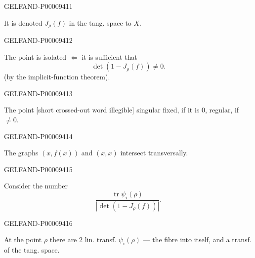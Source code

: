 \begin{GelfandAdjacentEvidence}{GELFAND-P000094}{11}

It is denoted $J_\rho(f)$ in the tang. space to $X$.
\end{GelfandAdjacentEvidence}
\begin{GelfandAdjacentEvidence}{GELFAND-P000094}{12}

The point is isolated $\Leftarrow$ it is sufficient that
\begin{equation*}\det(1-J_\rho(f))\ne0.\end{equation*}
(by the implicit-function theorem).
\end{GelfandAdjacentEvidence}
\begin{GelfandAdjacentEvidence}{GELFAND-P000094}{13}

The point [short crossed-out word illegible] singular fixed, if it is $0$, regular, if $\ne0$.
\end{GelfandAdjacentEvidence}
\begin{GelfandAdjacentEvidence}{GELFAND-P000094}{14}

The graphs $(x,f(x))$ and $(x,x)$ intersect transversally.
\end{GelfandAdjacentEvidence}
\begin{GelfandAdjacentEvidence}{GELFAND-P000094}{15}

Consider the number
\begin{equation*}
\frac{\operatorname{tr}\psi_i(\rho)}{|\det(1-J_\rho(f))|}.
\end{equation*}
\end{GelfandAdjacentEvidence}
\begin{GelfandAdjacentEvidence}{GELFAND-P000094}{16}

At the point $\rho$ there are $2$ lin. transf. $\psi_i(\rho)$ — the fibre into itself,
and a transf. of the tang. space.
\end{GelfandAdjacentEvidence}
